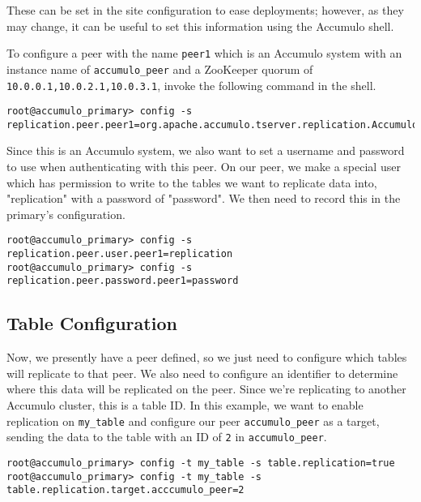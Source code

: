 These can be set in the site configuration to ease deployments; however, as they may
change, it can be useful to set this information using the Accumulo shell.

To configure a peer with the name \texttt{peer1} which is an Accumulo system with an instance name of
\texttt{accumulo\_peer}
and a ZooKeeper quorum of \texttt{10.0.0.1,10.0.2.1,10.0.3.1}, invoke the following
command in the shell.

\begingroup\fontsize{8pt}{8pt}\selectfont\begin{verbatim}
root@accumulo_primary> config -s
replication.peer.peer1=org.apache.accumulo.tserver.replication.AccumuloReplicaSystem,accumulo_peer,10.0.0.1,10.0.2.1,10.0.3.1
\end{verbatim}\endgroup

Since this is an Accumulo system, we also want to set a username and password
to use when authenticating with this peer. On our peer, we make a special user
which has permission to write to the tables we want to replicate data into, "replication"
with a password of "password". We then need to record this in the primary's configuration.

\begingroup\fontsize{8pt}{8pt}\selectfont\begin{verbatim}
root@accumulo_primary> config -s replication.peer.user.peer1=replication
root@accumulo_primary> config -s replication.peer.password.peer1=password
\end{verbatim}\endgroup

\subsection{Table Configuration}

Now, we presently have a peer defined, so we just need to configure which tables will
replicate to that peer. We also need to configure an identifier to determine where
this data will be replicated on the peer. Since we're replicating to another Accumulo
cluster, this is a table ID. In this example, we want to enable replication on
\texttt{my\_table} and configure our peer \texttt{accumulo\_peer} as a target, sending
the data to the table with an ID of \texttt{2} in \texttt{accumulo\_peer}.

\begingroup\fontsize{8pt}{8pt}\selectfont\begin{verbatim}
root@accumulo_primary> config -t my_table -s table.replication=true
root@accumulo_primary> config -t my_table -s table.replication.target.acccumulo_peer=2
\end{verbatim}\endgroup

